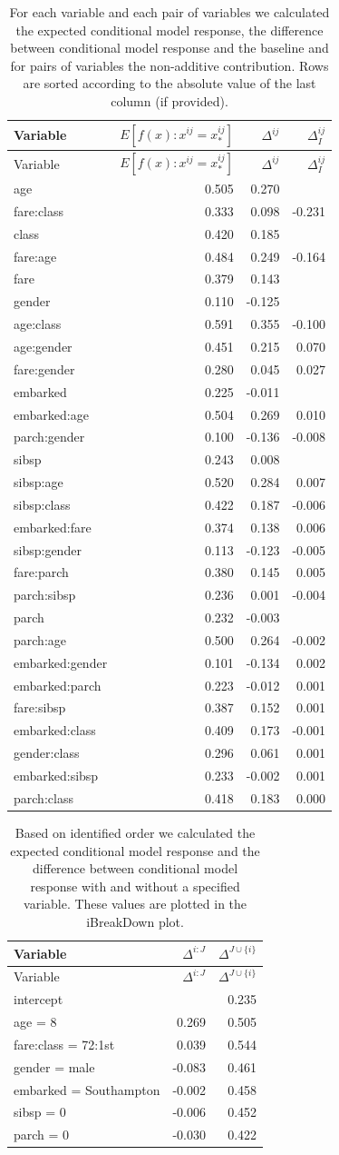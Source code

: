 \documentclass[12pt,]{krantz}
\theoremstyle{definition}
\theoremstyle{definition}
\theoremstyle{definition}
\theoremstyle{remark}
\begin{document}
\begin{longtable}[]{@{}lrrr@{}}
\caption{\label{tab:titanicIBreakDownList} For each variable and each pair
of variables we calculated the expected conditional model response, the
difference between conditional model response and the baseline and for
pairs of variables the non-additive contribution. Rows are sorted
according to the absolute value of the last column (if
provided).}\tabularnewline
\toprule
Variable & \(E[f(x):x^{ij}= x_*^{ij}]\) & \(\Delta^{ij}\) &
\(\Delta_I^{ij}\)\tabularnewline
\midrule
\endfirsthead
\toprule
Variable & \(E[f(x):x^{ij}= x_*^{ij}]\) & \(\Delta^{ij}\) &
\(\Delta_I^{ij}\)\tabularnewline
\midrule
\endhead
age & 0.505 & 0.270 &\tabularnewline
fare:class & 0.333 & 0.098 & -0.231\tabularnewline
class & 0.420 & 0.185 &\tabularnewline
fare:age & 0.484 & 0.249 & -0.164\tabularnewline
fare & 0.379 & 0.143 &\tabularnewline
gender & 0.110 & -0.125 &\tabularnewline
age:class & 0.591 & 0.355 & -0.100\tabularnewline
age:gender & 0.451 & 0.215 & 0.070\tabularnewline
fare:gender & 0.280 & 0.045 & 0.027\tabularnewline
embarked & 0.225 & -0.011 &\tabularnewline
embarked:age & 0.504 & 0.269 & 0.010\tabularnewline
parch:gender & 0.100 & -0.136 & -0.008\tabularnewline
sibsp & 0.243 & 0.008 &\tabularnewline
sibsp:age & 0.520 & 0.284 & 0.007\tabularnewline
sibsp:class & 0.422 & 0.187 & -0.006\tabularnewline
embarked:fare & 0.374 & 0.138 & 0.006\tabularnewline
sibsp:gender & 0.113 & -0.123 & -0.005\tabularnewline
fare:parch & 0.380 & 0.145 & 0.005\tabularnewline
parch:sibsp & 0.236 & 0.001 & -0.004\tabularnewline
parch & 0.232 & -0.003 &\tabularnewline
parch:age & 0.500 & 0.264 & -0.002\tabularnewline
embarked:gender & 0.101 & -0.134 & 0.002\tabularnewline
embarked:parch & 0.223 & -0.012 & 0.001\tabularnewline
fare:sibsp & 0.387 & 0.152 & 0.001\tabularnewline
embarked:class & 0.409 & 0.173 & -0.001\tabularnewline
gender:class & 0.296 & 0.061 & 0.001\tabularnewline
embarked:sibsp & 0.233 & -0.002 & 0.001\tabularnewline
parch:class & 0.418 & 0.183 & 0.000\tabularnewline
\bottomrule
\end{longtable}

\begin{longtable}[]{@{}lrr@{}}
\caption{\label{tab:titanicIBreakDownList2} Based on identified order we
calculated the expected conditional model response and the difference
between conditional model response with and without a specified
variable. These values are plotted in the iBreakDown
plot.}\tabularnewline
\toprule
Variable & \(\Delta^{i:J}\) & \(\Delta^{J\cup\{i\}}\)\tabularnewline
\midrule
\endfirsthead
\toprule
Variable & \(\Delta^{i:J}\) & \(\Delta^{J\cup\{i\}}\)\tabularnewline
\midrule
\endhead
intercept & & 0.235\tabularnewline
age = 8 & 0.269 & 0.505\tabularnewline
fare:class = 72:1st & 0.039 & 0.544\tabularnewline
gender = male & -0.083 & 0.461\tabularnewline
embarked = Southampton & -0.002 & 0.458\tabularnewline
sibsp = 0 & -0.006 & 0.452\tabularnewline
parch = 0 & -0.030 & 0.422\tabularnewline
\bottomrule
\end{longtable}
\end{document}
